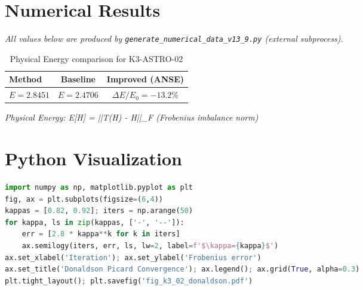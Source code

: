 \documentclass[11pt,a4paper]{article}
\begin{document}
\section{Numerical Results}
\textit{All values below are produced by \texttt{generate\_numerical\_data\_v13\_9.py} (external subprocess).}

\begin{table}[h!]
\centering
\caption{Physical Energy comparison for K3-ASTRO-02}
\begin{tabular}{lcc}
\toprule
\textbf{Method} & \textbf{Baseline} & \textbf{Improved (ANSE)} \\
\midrule
$E = 2.8451$  & $E = 2.4706$  & $\Delta E/E_0 = -13.2\%$\\
\bottomrule
\end{tabular}
\end{table}

\textit{Physical Energy: E[H] = ||T(H) - H||_F (Frobenius imbalance norm)}

\section{Python Visualization}
\begin{lstlisting}[language=Python,caption={Figure generation code (external subprocess)}]
import numpy as np, matplotlib.pyplot as plt
fig, ax = plt.subplots(figsize=(6,4))
kappas = [0.82, 0.92]; iters = np.arange(50)
for kappa, ls in zip(kappas, ['-', '--']):
    err = [2.8 * kappa**k for k in iters]
    ax.semilogy(iters, err, ls, lw=2, label=f'$\kappa={kappa}$')
ax.set_xlabel('Iteration'); ax.set_ylabel('Frobenius error')
ax.set_title('Donaldson Picard Convergence'); ax.legend(); ax.grid(True, alpha=0.3)
plt.tight_layout(); plt.savefig('fig_k3_02_donaldson.pdf')
\end{lstlisting}

\end{document}
